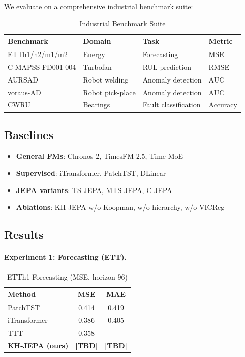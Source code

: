 \documentclass{article}
\begin{document}
We evaluate on a comprehensive industrial benchmark suite:

\begin{table}[h]
\centering
\caption{Industrial Benchmark Suite}
\begin{tabular}{llll}
\toprule
\textbf{Benchmark} & \textbf{Domain} & \textbf{Task} & \textbf{Metric} \\
\midrule
ETTh1/h2/m1/m2 & Energy & Forecasting & MSE \\
C-MAPSS FD001-004 & Turbofan & RUL prediction & RMSE \\
AURSAD & Robot welding & Anomaly detection & AUC \\
voraus-AD & Robot pick-place & Anomaly detection & AUC \\
CWRU & Bearings & Fault classification & Accuracy \\
\bottomrule
\end{tabular}
\end{table}

\subsection{Baselines}

\begin{itemize}
    \item \textbf{General FMs}: Chronos-2, TimesFM 2.5, Time-MoE
    \item \textbf{Supervised}: iTransformer, PatchTST, DLinear
    \item \textbf{JEPA variants}: TS-JEPA, MTS-JEPA, C-JEPA
    \item \textbf{Ablations}: KH-JEPA w/o Koopman, w/o hierarchy, w/o VICReg
\end{itemize}

\subsection{Results}

\paragraph{Experiment 1: Forecasting (ETT).}

\begin{table}[h]
\centering
\caption{ETTh1 Forecasting (MSE, horizon 96)}
\begin{tabular}{lcc}
\toprule
\textbf{Method} & \textbf{MSE} & \textbf{MAE} \\
\midrule
PatchTST & 0.414 & 0.419 \\
iTransformer & 0.386 & 0.405 \\
TTT & 0.358 & — \\
\textbf{KH-JEPA (ours)} & \textbf{[TBD]} & \textbf{[TBD]} \\
\bottomrule
\end{tabular}
\end{table}
\end{document}

